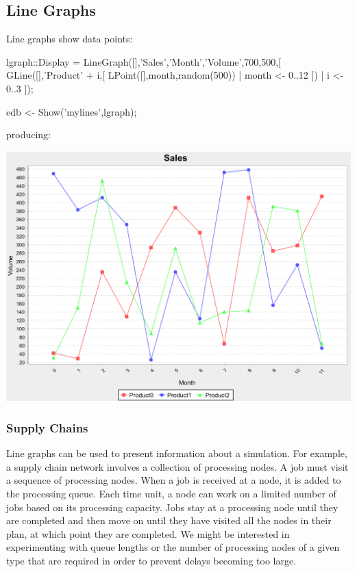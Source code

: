 \documentclass[5p,times]{elsarticle}
\begin{document}
\subsection{Line Graphs}

\label{sec:lines}

Line graphs show data points:
\begin{ESL}
lgraph::Display = 
  LineGraph([],'Sales','Month','Volume',700,500,[
    GLine([],'Product' + i,[
      LPoint([],month,random(500)) | month <- 0..12 ]) 
    | i <- 0..3 ]);

edb <- Show('mylines',lgraph);
\end{ESL}
producing:
\begin{center}
\includegraphics[width=\columnwidth]{lines}
\end{center}

\subsubsection{Supply Chains}

\label{sec:supply_chains}

Line graphs can be used to present information about a simulation. For example, a supply chain network involves a collection of processing nodes. A job must visit a sequence of processing nodes. When a job is received at a node, it is added to the processing queue. Each time unit, a node can work on a limited number of jobs based on its processing capacity. Jobs stay at a processing node until they are completed and then move on until they have visited all the nodes in their plan, at which point they are completed. We might be interested in experimenting with queue lengths or the number of processing nodes of a given type that are required in order to prevent delays becoming too large.
\end{document}
